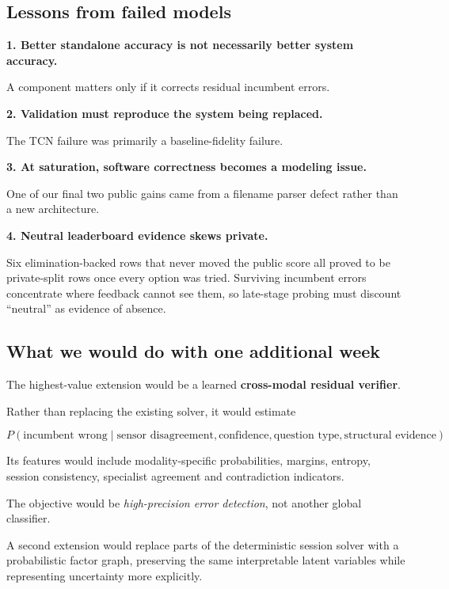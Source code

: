 \documentclass[12pt,a4paper]{article}
\begin{document}
\subsection{Lessons from failed models}

\textbf{1. Better standalone accuracy is not necessarily better system accuracy.}

A component matters only if it corrects residual incumbent errors.

\textbf{2. Validation must reproduce the system being replaced.}

The TCN failure was primarily a baseline-fidelity failure.

\textbf{3. At saturation, software correctness becomes a modeling issue.}

One of our final two public gains came from a filename parser defect rather than
a new architecture.

\textbf{4. Neutral leaderboard evidence skews private.}

Six elimination-backed rows that never moved the public score all proved to be
private-split rows once every option was tried. Surviving incumbent errors
concentrate where feedback cannot see them, so late-stage probing must discount
``neutral'' as evidence of absence.

\subsection{What we would do with one additional week}

The highest-value extension would be a learned \textbf{cross-modal residual verifier}.

Rather than replacing the existing solver, it would estimate

\[
P(\text{incumbent wrong}\mid
\text{sensor disagreement},
\text{confidence},
\text{question type},
\text{structural evidence}).
\]

Its features would include modality-specific probabilities, margins, entropy,
session consistency, specialist agreement and contradiction indicators.

The objective would be \emph{high-precision error detection}, not another
global classifier.

A second extension would replace parts of the deterministic session solver with
a probabilistic factor graph, preserving the same interpretable latent variables
while representing uncertainty more explicitly.

\end{document}
